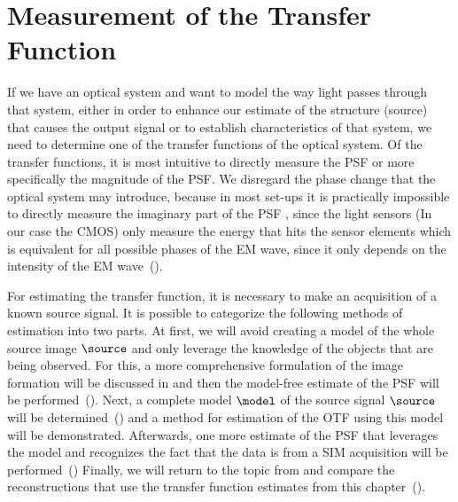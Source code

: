 \setchapterpreamble[u]{\margintoc}
\chapter{Measurement of the Transfer Function}

If we have an optical system and want to model the way light passes through that system, either in order to enhance our
    estimate of the structure (source) that causes the output signal or to establish characteristics of that system, we 
    need to determine one of the transfer functions of the optical system. %
Of the transfer functions, it is most intuitive to directly measure the \ac{PSF} or more specifically the
    magnitude of the \ac{PSF}.
We disregard the phase change that the optical system may introduce, because in most set-ups it is practically 
    impossible to directly measure the imaginary part of the \ac{PSF} , since 
    the light sensors (In our case the \ac{CMOS}) only measure the energy that hits the sensor elements which is 
    equivalent for all possible phases of the \ac{EM} wave, since it only depends on the intensity of the \ac{EM} 
    wave~(). %

For estimating the transfer function, it is necessary to make an acquisition of a known source signal.
It is possible to categorize the following methods of estimation into two parts.
At first, we will avoid creating a model of the whole source image \(\source\) and only leverage the knowledge of the
    objects that are being observed.
For this, a more comprehensive formulation of the image formation will be discussed in  
    and then the model-free estimate of the \ac{PSF} will be performed~().
Next, a complete model \(\model\) of the source signal \(\source\) will be determined~() and a 
    method for estimation of the \ac{OTF} using this model will be demonstrated.
Afterwards, one more estimate of the \ac{PSF} that leverages the model and recognizes the fact that the data is from a 
    \ac{SIM} acquisition will be performed~()
Finally, we will return to the topic from  and compare the reconstructions that use the 
    transfer function estimates from this chapter~().

